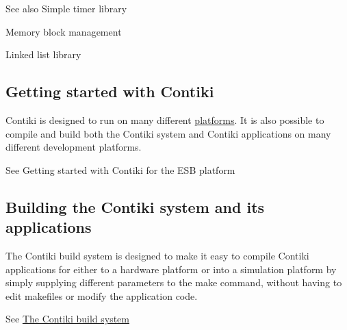 \begin{DoxySeeAlso}{\-See also}
\-Simple timer library 

\-Memory block management 

\-Linked list library
\end{DoxySeeAlso}
\hypertarget{index_contiki-mainpage-getting-started}{}\subsection{\-Getting started with Contiki}\label{index_contiki-mainpage-getting-started}
\-Contiki is designed to run on many different \hyperlink{a00051}{platforms}. \-It is also possible to compile and build both the \-Contiki system and \-Contiki applications on many different development platforms.

\-See \-Getting started with \-Contiki for the \-E\-S\-B platform \hypertarget{index_contiki-mainpage-building}{}\subsection{\-Building the Contiki system and its applications}\label{index_contiki-mainpage-building}
\-The \-Contiki build system is designed to make it easy to compile \-Contiki applications for either to a hardware platform or into a simulation platform by simply supplying different parameters to the {\ttfamily make} command, without having to edit makefiles or modify the application code.

\-See \hyperlink{a00044}{\-The \-Contiki build system} 